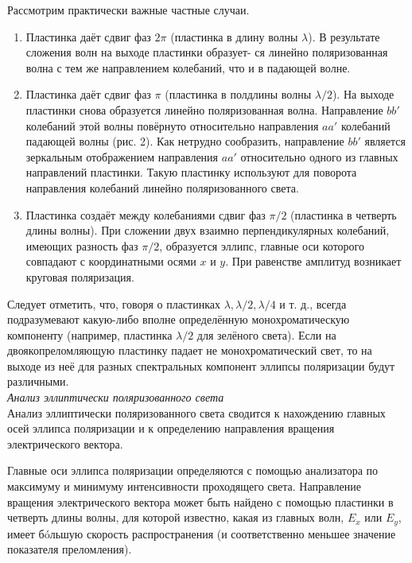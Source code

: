 \documentclass[a4paper, 12pt]{article}%
\begin{document}
	
	Рассмотрим практически важные частные случаи.
	
	\begin{enumerate}
		
		\item Пластинка даёт сдвиг фаз $ 2\pi $ (пластинка в длину волны $ \lambda $). В результате сложения волн на выходе пластинки образует-
		ся линейно поляризованная волна с тем же направлением колебаний, что и в падающей волне.
		
		\item Пластинка даёт сдвиг фаз $ \pi $ (пластинка в полдлины волны $ \lambda / 2 $). На выходе пластинки снова образуется линейно поляризованная волна. Направление $ bb' $ колебаний этой волны повёрнуто относительно направления $ aa' $ колебаний падающей волны (рис. 2). Как нетрудно сообразить, направление $ bb' $ является зеркальным отображением направления $ aa' $ относительно одного из главных направлений пластинки. Такую пластинку используют для поворота направления колебаний линейно поляризованного света.
		
		\item Пластинка создаёт между колебаниями сдвиг фаз $ \pi/2 $ (пластинка
		в четверть длины волны). При сложении двух взаимно перпендикулярных колебаний, имеющих разность фаз $ \pi/2 $, образуется эллипс, главные оси которого совпадают с координатными осями $ x $ и $ y $. При равенстве амплитуд возникает круговая поляризация.
		
	\end{enumerate}
	
	Следует отметить, что, говоря о пластинках $ \lambda , \lambda/2, \lambda/4  $ и т. д., всегда подразумевают какую-либо вполне определённую монохроматическую
	компоненту (например, пластинка $ \lambda/2 $ для зелёного света). Если на двоякопреломляющую пластинку падает не монохроматический свет, то на
	выходе из неё для разных спектральных компонент эллипсы поляризации будут различными.\\
	
	\textit{Анализ эллиптически поляризованного света}\\
	
	Анализ эллиптически поляризованного света сводится к нахождению главных осей
	эллипса поляризации и к определению направления вращения электрического вектора.
	
	Главные оси эллипса поляризации определяются с помощью анализатора по максимуму и минимуму интенсивности проходящего света.
	Направление вращения электрического вектора может быть найдено
	с помощью пластинки в четверть длины волны, для которой известно,
	какая из главных волн, $ E_x $ или $ E_y $, имеет б\'{o}льшую скорость распространения (и соответственно меньшее значение показателя преломления).
	
\end{document}
